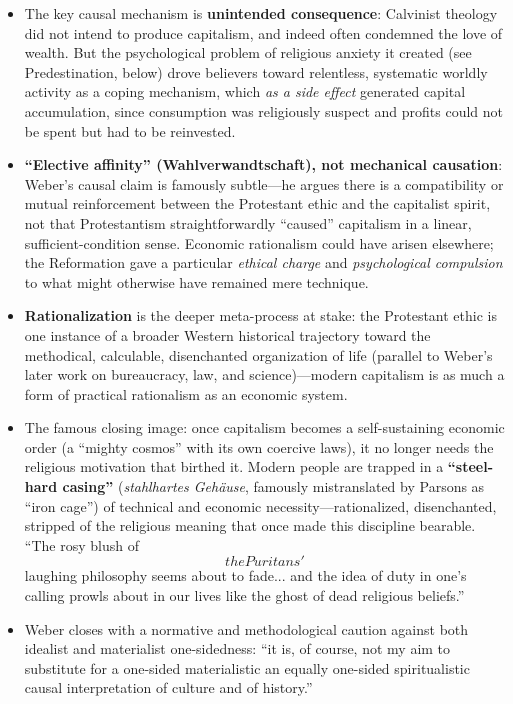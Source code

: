 \documentclass[12pt]{article}
\begin{document}
\begin{itemize}[leftmargin=*, itemsep=4pt]
    \item The key causal mechanism is \textbf{unintended consequence}: Calvinist theology did not intend to produce capitalism, and indeed often condemned the love of wealth. But the psychological problem of religious anxiety it created (see Predestination, below) drove believers toward relentless, systematic worldly activity as a coping mechanism, which \emph{as a side effect} generated capital accumulation, since consumption was religiously suspect and profits could not be spent but had to be reinvested.
    \item \textbf{``Elective affinity'' (Wahlverwandtschaft), not mechanical causation}: Weber's causal claim is famously subtle---he argues there is a compatibility or mutual reinforcement between the Protestant ethic and the capitalist spirit, not that Protestantism straightforwardly ``caused'' capitalism in a linear, sufficient-condition sense. Economic rationalism could have arisen elsewhere; the Reformation gave a particular \emph{ethical charge} and \emph{psychological compulsion} to what might otherwise have remained mere technique.
    \item \textbf{Rationalization} is the deeper meta-process at stake: the Protestant ethic is one instance of a broader Western historical trajectory toward the methodical, calculable, disenchanted organization of life (parallel to Weber's later work on bureaucracy, law, and science)---modern capitalism is as much a form of practical rationalism as an economic system.
    \item The famous closing image: once capitalism becomes a self-sustaining economic order (a ``mighty cosmos'' with its own coercive laws), it no longer needs the religious motivation that birthed it. Modern people are trapped in a \textbf{``steel-hard casing''} (\textit{stahlhartes Geh\"ause}, famously mistranslated by Parsons as ``iron cage'') of technical and economic necessity---rationalized, disenchanted, stripped of the religious meaning that once made this discipline bearable. ``The rosy blush of \[the Puritans'\] laughing philosophy seems about to fade... and the idea of duty in one's calling prowls about in our lives like the ghost of dead religious beliefs.''
    \item Weber closes with a normative and methodological caution against both idealist and materialist one-sidedness: ``it is, of course, not my aim to substitute for a one-sided materialistic an equally one-sided spiritualistic causal interpretation of culture and of history.''
\end{itemize}
\end{document}
